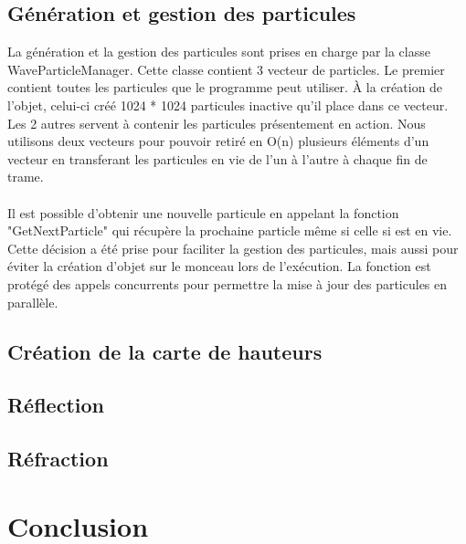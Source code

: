\documentclass[a4paper, 12pt]{article} %
\begin{document}
\subsection{Génération et gestion des particules}
	La génération et la gestion des particules sont prises en charge par la classe WaveParticleManager. Cette classe contient 3 vecteur de particles.
	Le premier contient toutes les particules que le programme peut utiliser. À la création de l'objet, celui-ci créé 1024 * 1024 particules inactive 
	qu'il place dans ce vecteur. Les 2 autres servent à contenir les particules présentement en action. Nous utilisons deux vecteurs pour pouvoir 
	retiré en O(n) plusieurs éléments d'un vecteur en transferant les particules en vie de l'un à l'autre à chaque fin de trame. 
    
	\paragraph{}
	Il est possible d'obtenir une nouvelle particule en appelant la fonction "GetNextParticle" qui récupère la prochaine particle même si celle si est en vie.
	Cette décision a été prise pour faciliter la gestion des particules, mais aussi pour éviter la création d'objet sur le monceau lors de l'exécution. La 
	fonction est protégé des appels concurrents pour permettre la mise à jour des particules en parallèle.
\subsection{Création de la carte de hauteurs}
\subsection{Réflection}
\subsection{Réfraction}
\section{Conclusion}
\end{document}
